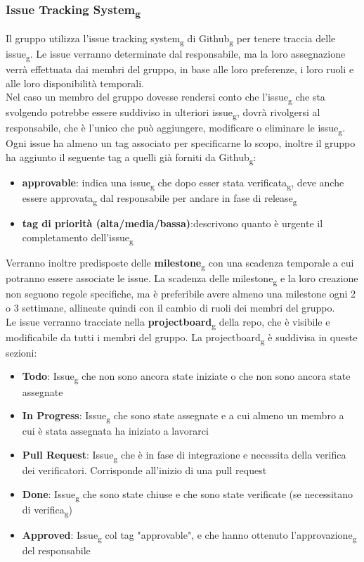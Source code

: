 \subsubsection{Issue Tracking System\textsubscript{g}}
Il gruppo utilizza l'issue tracking system\textsubscript{g} di Github\textsubscript{g} per tenere traccia delle issue\textsubscript{g}. 
Le issue verranno determinate dal responsabile, ma la loro assegnazione verrà effettuata dai membri del gruppo, in base alle loro preferenze, i loro ruoli e alle loro disponibilità temporali.\\
Nel caso un membro del gruppo dovesse rendersi conto che l'issue\textsubscript{g} che sta svolgendo potrebbe essere suddiviso in ulteriori issue\textsubscript{g}, dovrà rivolgersi al responsabile, che è l'unico che può aggiungere, modificare o eliminare le issue\textsubscript{g}.\\
Ogni issue ha almeno un tag associato per specificarne lo scopo, inoltre il gruppo ha aggiunto il seguente tag a quelli già forniti da Github\textsubscript{g}:
\begin{itemize}
	\item \textbf{approvable}: indica una issue\textsubscript{g} che dopo esser stata verificata\textsubscript{g}, deve anche essere approvata\textsubscript{g} dal responsabile per andare in fase di release\textsubscript{g}
	\item \textbf{tag di priorità (alta/media/bassa)}:descrivono quanto è urgente il completamento dell'issue\textsubscript{g} 
\end{itemize}
Verranno inoltre predisposte delle \textbf{milestone}\textsubscript{g} con una scadenza temporale a cui potranno essere associate le issue. 
La scadenza delle milestone\textsubscript{g} e la loro creazione non seguono regole specifiche, ma è preferibile avere almeno una milestone ogni 2 o 3 settimane, allineate quindi con il cambio di ruoli dei membri del gruppo.\\
Le issue verranno tracciate nella \textbf{projectboard}\textsubscript{g} della repo, che è visibile e modificabile da tutti i membri del gruppo.
La projectboard\textsubscript{g} è suddivisa in queste sezioni:
\begin{itemize}
	\item \textbf{Todo}: Issue\textsubscript{g} che non sono ancora state iniziate o che non sono ancora state assegnate
	\item \textbf{In Progress}: Issue\textsubscript{g} che sono state assegnate e a cui almeno un membro a cui è stata assegnata ha iniziato a lavorarci
	\item \textbf{Pull Request}: Issue\textsubscript{g} che è in fase di integrazione e necessita della verifica dei verificatori. Corrisponde all'inizio di una pull request
	\item \textbf{Done}: Issue\textsubscript{g} che sono state chiuse e che sono state verificate (se necessitano di verifica\textsubscript{g})
	\item \textbf{Approved}: Issue\textsubscript{g} col tag "approvable", e che hanno ottenuto l'approvazione\textsubscript{g} del responsabile
\end{itemize}
